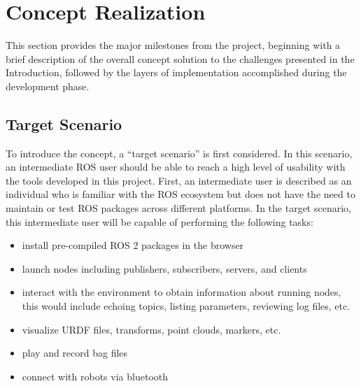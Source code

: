 \chapter{Concept Realization}\label{cha:concept}

    This section provides the major milestones from the project, beginning with a brief description of the overall concept solution to the challenges presented in the Introduction, followed by the layers of implementation accomplished during the development phase.


\section{Target Scenario}\label{sec:target}



    To introduce the concept, a ``target scenario'' is first considered. In this
    scenario, an intermediate \ac{ROS} user should be able to reach a high level 
    of usability with the tools developed in this project. First, an
    intermediate user is described as an individual who is familiar with the 
    \ac{ROS} ecosystem but does not have the need to maintain or test \ac{ROS} packages
    across different platforms. In the target scenario, this intermediate
    user will be capable of performing the following tasks:

    \begin{itemize}
        \item install pre-compiled ROS 2 packages in the browser
        \item launch nodes including publishers, subscribers, servers, and clients
        \item interact with the environment to obtain information about 
                running nodes, this would include echoing topics, listing 
                parameters, reviewing log files, etc.
        \item visualize \ac{URDF} files, transforms, point clouds, markers, etc.
        \item play and record bag files %
        \item connect with robots via bluetooth
    \end{itemize}

